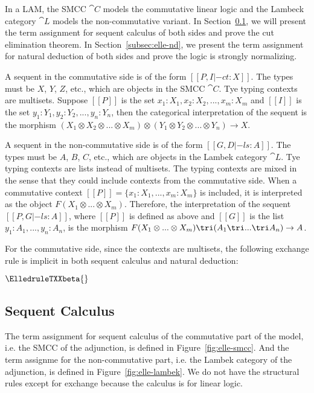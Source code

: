 In a LAM, the SMCC $\cat{C}$ models the commutative linear logic and the Lambeck category
$\cat{L}$ models the non-commutative variant. In Section~\ref{subsec:elle}, we will present the
term assignment for sequent calculus of both sides and prove the cut elimination theorem. In
Section~\ref{subsec:elle-nd}, we present the term assignment for natural deduction of both sides
and prove the logic is strongly normalizing.

A sequent in the commutative side is of the form $[[P,I |-c t : X]]$. The types must be $X$,
$Y$, $Z$, etc., which are objects in the SMCC $\cat{C}$. Tye typing contexts are multisets.
Suppose $[[P]]$ is the set $x_1:X_1, x_2:X_2, ..., x_m:X_m$ and $[[I]]$ is the set
$y_1:Y_1, y_2:Y_2,...,y_n:Y_n$, then the categorical interpretation of the sequent is the
morphism $(X_1\otimes X_2\otimes...\otimes X_m)\otimes(Y_1\otimes Y_2\otimes...\otimes Y_n)\rightarrow X$.

A sequent in the non-commutative side is of the form $[[G,D |-l s : A]]$. The types must be $A$,
$B$, $C$, etc., which are objects in the Lambek category $\cat{L}$. Tye typing contexts are
lists instead of multisets. The typing contexts are mixed in the sense that they could include
contexts from the commutative side. When a commutative context $[[P]]=\{x_1:X_1,...,x_m:X_m\}$
is included, it is interpreted as the object $F(X_1\otimes...\otimes X_m)$. Therefore, the
interpretation of the sequent $[[P,G |-l s : A]]$, where $[[P]]$ is defined as above and $[[G]]$
is the list $y_1:A_1,...,y_n:A_n$, is the morphism
$F(X_1\otimes...\otimes X_m)\tri(A_1\tri...\tri A_n)\rightarrow A$.

For the commutative side, since the contexts are multisets, the following exchange rule
is implicit in both sequent calculus and natural deduction:

\begin{center}
  \scriptsize
  $\ElledruleTXXbeta{}$
\end{center}



\subsection{Sequent Calculus}
\label{subsec:elle}

The term assignment for sequent calculus of the commutative part of the model, i.e. the SMCC of
the adjunction, is defined in Figure~\ref{fig:elle-smcc}. And the term assignme for the
non-commutative part, i.e. the Lambek category of the adjunction, is defined in
Figure~\ref{fig:elle-lambek}. We do not have the structural rules except for exchange because
the calculus is for linear logic. 

